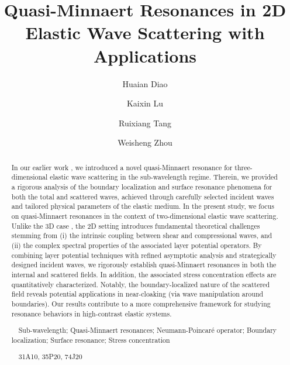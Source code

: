 \documentclass[11pt,reqno,twoside]{amsart}
\title[Quasi-Minnaert Resonances in 2D Elastic Wave Scattering]{Quasi-Minnaert Resonances in 2D Elastic Wave Scattering with Applications}
\author{Huaian Diao}
\author{Kaixin Lu}
\author{Ruixiang Tang}
\author{Weisheng Zhou}
\theoremstyle{definition}
\theoremstyle{remark}
\numberwithin{equation}{section}
\begin{document}
	
	\maketitle
\begin{abstract}
		
In our earlier work \cite{DTL}, we introduced a novel quasi-Minnaert resonance for three-dimensional elastic wave scattering in the sub-wavelength regime. Therein, we provided a rigorous analysis of the boundary localization and surface resonance phenomena for both the total and scattered waves, achieved through carefully selected incident waves and tailored physical parameters of the elastic medium. In the present study, we focus on quasi-Minnaert resonances in the context of two-dimensional elastic wave scattering. Unlike the 3D case \cite{DTL}, the 2D setting introduces fundamental theoretical challenges stemming from (i) the intrinsic coupling between shear and compressional waves, and (ii) the complex spectral properties of the associated layer potential operators. By combining layer potential techniques with refined asymptotic analysis and strategically designed incident waves, we rigorously establish quasi-Minnaert resonances in both the internal and scattered fields. In addition, the associated stress concentration effects are quantitatively characterized.  Notably, the boundary-localized nature of the scattered field reveals potential applications in near-cloaking (via wave manipulation around boundaries). Our results contribute to a more comprehensive framework for studying resonance behaviors in high-contrast elastic systems.

 






	\medskip
		
~~Sub-wavelength; Quasi-Minnaert resonances; Neumann-Poincar\'e operator; Boundary localization; Surface resonance; Stress concentration

\medskip
{}~~31A10, 35P20, 74J20

\end{abstract}
\end{document}
